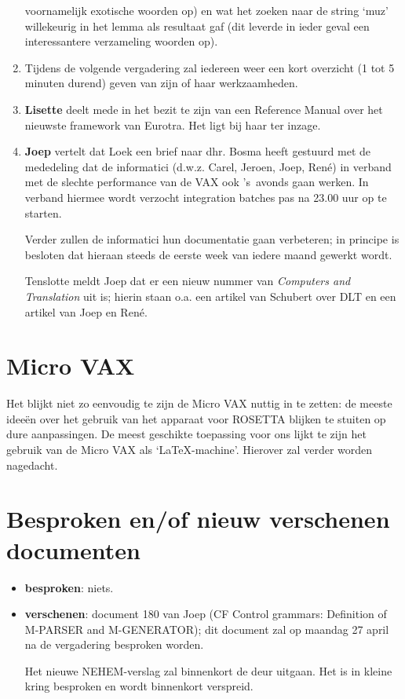 \begin{enumerate}
        voornamelijk exotische woorden op) en wat het zoeken naar de string 
        `muz' willekeurig in het lemma als resultaat gaf (dit leverde in ieder
        geval een interessantere verzameling woorden op).
  \item Tijdens de volgende vergadering zal iedereen weer een kort overzicht
        (1 tot 5 minuten durend) geven van zijn of haar werkzaamheden.
  \item {\bf Lisette} deelt mede in het bezit te zijn van een Reference Manual 
        over het nieuwste framework van Eurotra. Het ligt bij haar ter inzage.
  \item {\bf Joep} vertelt dat Loek een brief naar dhr. Bosma heeft gestuurd 
        met de
        mededeling dat de informatici (d.w.z. Carel, Jeroen, Joep, Ren\'{e}) 
        in verband met de slechte performance van de VAX ook 's~avonds gaan 
        werken. In verband hiermee wordt verzocht integration batches pas na
        23.00 uur op te starten.

        Verder zullen de informatici hun documentatie gaan verbeteren; in 
        principe is besloten dat hieraan steeds de eerste week van iedere
        maand gewerkt wordt.

        Tenslotte meldt Joep dat er een nieuw nummer van {\em Computers and 
        Translation} uit is; hierin staan o.a. een artikel van Schubert over DLT
        en een artikel van Joep en Ren\'{e}.
\end{enumerate}
\section {Micro VAX}
Het blijkt niet zo eenvoudig te zijn de Micro VAX nuttig in te zetten: de meeste
idee\"{e}n over het gebruik van het apparaat voor ROSETTA blijken te stuiten op
dure aanpassingen. De meest geschikte toepassing voor ons lijkt te zijn het 
gebruik van de Micro VAX als `\LaTeX-machine'. Hierover zal verder worden 
nagedacht. 

\section {Besproken en/of nieuw verschenen documenten}

\begin{itemize}
  \item {\bf besproken}: niets.
  \item {\bf verschenen}: document 180 van Joep (CF Control grammars:
        Definition of M-PARSER and M-GENERATOR); dit document zal op maandag
        27 april na de vergadering besproken worden.

        Het nieuwe NEHEM-verslag zal binnenkort de deur uitgaan. Het is in 
        kleine kring besproken en wordt binnenkort verspreid.

\end{itemize}
